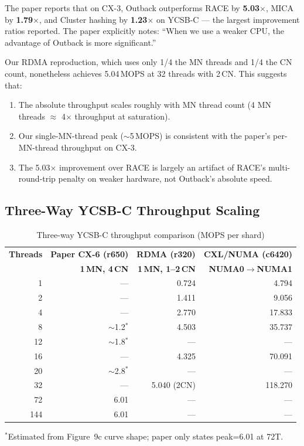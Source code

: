 \documentclass[11pt,a4paper]{article}
\begin{document}
The paper reports that on CX-3, Outback outperforms RACE by \textbf{5.03$\times$}, MICA by \textbf{1.79$\times$}, and Cluster hashing by \textbf{1.23$\times$} on YCSB-C --- the largest improvement ratios reported. The paper explicitly notes: ``When we use a weaker CPU, the advantage of Outback is more significant.''

Our RDMA reproduction, which uses only 1/4 the MN threads and 1/4 the CN count, nonetheless achieves 5.04\,MOPS at 32 threads with 2\,CN. This suggests that:
\begin{enumerate}[nosep]
  \item The absolute throughput scales roughly with MN thread count (4 MN threads $\approx$ 4$\times$ throughput at saturation).
  \item Our single-MN-thread peak ($\sim$5\,MOPS) is consistent with the paper's per-MN-thread throughput on CX-3.
  \item The 5.03$\times$ improvement over RACE is largely an artifact of RACE's multi-round-trip penalty on weaker hardware, not Outback's absolute speed.
\end{enumerate}

\subsection{Three-Way YCSB-C Throughput Scaling}

\begin{table}[H]
\centering
\caption{Three-way YCSB-C throughput comparison (MOPS per shard)}
\label{tab:three-way}
\small
\begin{tabular}{@{}rrrr@{}}
\toprule
\textbf{Threads} & \textbf{Paper CX-6 (r650)} & \textbf{RDMA (r320)} & \textbf{CXL/NUMA (c6420)} \\
 & \textbf{1\,MN, 4\,CN} & \textbf{1\,MN, 1--2\,CN} & \textbf{NUMA0$\to$NUMA1} \\
\midrule
1  &  --- & 0.724 & 4.794 \\
2  &  --- & 1.411 & 9.056 \\
4  &  --- & 2.770 & 17.833 \\
8  & $\sim$1.2$^*$ & 4.503 & 35.737 \\
12 & $\sim$1.8$^*$ & --- & --- \\
16 & --- & 4.325 & 70.091 \\
20 & $\sim$2.8$^*$ & --- & --- \\
32 & --- & 5.040 (2CN) & 118.270 \\
72 & 6.01 & --- & --- \\
144 & 6.01 & --- & --- \\
\bottomrule
\end{tabular}

\vspace{2pt}
{\scriptsize $^*$Estimated from Figure~9c curve shape; paper only states peak=6.01 at 72T.}
\end{table}
\end{document}
